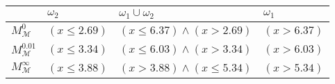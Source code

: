 \begin{tabular}{llll}
\toprule
 & $\omega_{2}$ & $\omega_{1} \cup \omega_{2}$ & $\omega_{1}$ \\
\midrule
$M^{0}_{\mathcal{M}_{}}$ & $(x \leq 2.69)$ & $(x \leq 6.37) \wedge (x > 2.69)$ & $(x > 6.37)$ \\
$M^{0.01}_{\mathcal{M}_{}}$ & $(x \leq 3.34)$ & $(x \leq 6.03) \wedge (x > 3.34)$ & $(x > 6.03)$ \\
$M^\infty_{\mathcal{M}_{}}$ & $(x \leq 3.88)$ & $(x > 3.88) \wedge (x \leq 5.34)$ & $(x > 5.34)$ \\
\bottomrule
\end{tabular}
